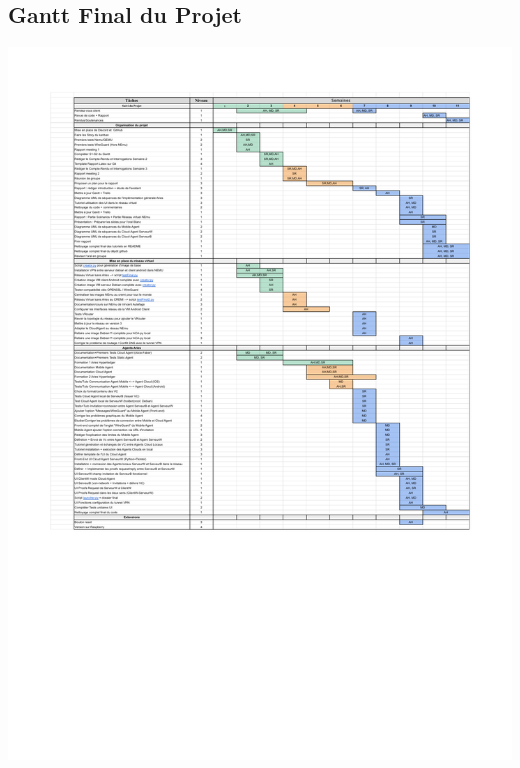 \documentclass[12pt, openany]{report}
\begin{document}
\subsection{Gantt Final du Projet} \label{gantt}
\includegraphics[scale=0.7]{Gantt_Final_PFE.pdf}
\end{document}
